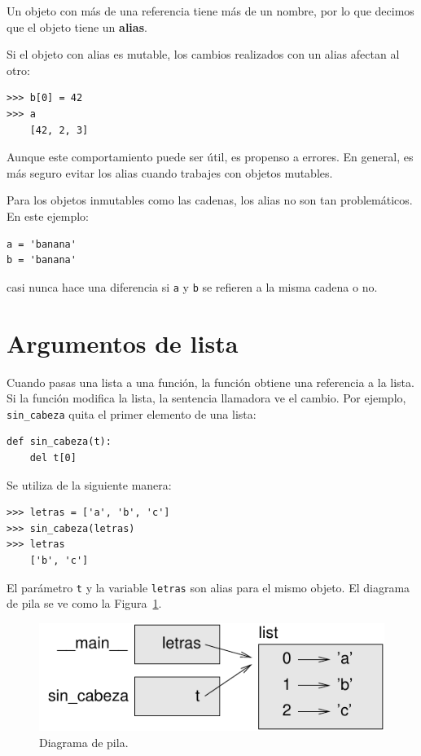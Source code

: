 \documentclass[10pt]{book}
\begin{document}
Un objeto con más de una referencia tiene más
de un nombre, por lo que decimos que el objeto tiene un {\bf alias}.

Si el objeto con alias es mutable, los cambios realizados con un alias afectan
al otro:

\begin{verbatim}
>>> b[0] = 42
>>> a
    [42, 2, 3]
\end{verbatim}
%
Aunque este comportamiento puede ser útil, es propenso a errores.  En general,
es más seguro evitar los alias cuando trabajes con objetos
mutables.

Para los objetos inmutables como las cadenas, los alias no son tan
problemáticos.  En este ejemplo:

\begin{verbatim}
a = 'banana'
b = 'banana'
\end{verbatim}
%
casi nunca hace una diferencia si {\tt a} y {\tt b} se refieren
a la misma cadena o no.


\section{Argumentos de lista}
\label{list.arguments}

Cuando pasas una lista a una función, la función obtiene una referencia a
la lista.  Si la función modifica la lista, la sentencia llamadora ve
el cambio.  Por ejemplo, \verb"sin_cabeza" quita el primer elemento
de una lista:

\begin{verbatim}
def sin_cabeza(t):
    del t[0]
\end{verbatim}
%
Se utiliza de la siguiente manera:

\begin{verbatim}
>>> letras = ['a', 'b', 'c']
>>> sin_cabeza(letras)
>>> letras
    ['b', 'c']
\end{verbatim}
%
El parámetro {\tt t} y la variable {\tt letras} son
alias para el mismo objeto.  El diagrama de pila se ve como la
Figura~\ref{fig.stack5}.

\begin{figure}
\centerline
{\includegraphics[scale=0.8]{figs/stack5.pdf}}
\caption{Diagrama de pila.}
\label{fig.stack5}
\end{figure}
\end{document}
